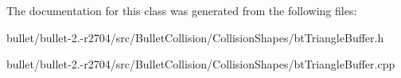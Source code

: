 The documentation for this class was generated from the following files\+:\begin{DoxyCompactItemize}
\item 
bullet/bullet-\/2.-\/r2704/src/\+Bullet\+Collision/\+Collision\+Shapes/bt\+Triangle\+Buffer.\+h\item 
bullet/bullet-\/2.-\/r2704/src/\+Bullet\+Collision/\+Collision\+Shapes/bt\+Triangle\+Buffer.\+cpp\end{DoxyCompactItemize}
